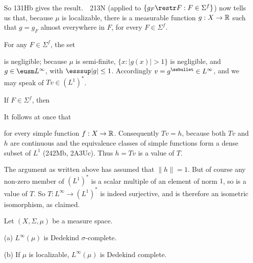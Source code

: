 {\noindent So 131Hb gives the result.\ \QeD\   213N (applied to
$\{g_F\restr F:F\in\Sigma^f\}$) now tells us
that, because $\mu$ is localizable, there is a measurable function
$g:X\to\Bbb R$ such that $g=g_F$ almost everywhere in $F$, for every
$F\in\Sigma^f$.
     
\medskip
     
 For any $F\in\Sigma^f$, the set
     
     
\noindent is negligible;  because $\mu$ is semi-finite,
$\{x:|g(x)|>1\}$ is negligible, and $g\in\eusm L^{\infty}$, with
$\esssup|g|\le 1$.   Accordingly $v=g^{\ssbullet}\in L^{\infty}$, and we
may speak of $Tv\in(L^1)^*$.
     
\medskip
     
 If $F\in\Sigma^f$, then

     
\noindent It follows at once that

     
\noindent for every simple function $f:X\to\Bbb R$.
Consequently $Tv=h$, because both $Tv$ and $h$ are
continuous and the equivalence classes of simple functions form a dense
subset of $L^1$ (242Mb, 2A3Uc).   Thus $h=Tv$ is a value of $T$.
     
\medskip
     
 The
argument as written above has assumed that $\|h\|=1$.   But of course
any non-zero member of $(L^1)^*$ is a scalar multiple of an element of
norm $1$, so is a value of $T$.   So $T:L^{\infty}\to(L^1)^*$ is indeed
surjective, and is therefore an isometric isomorphism, as claimed.
}%
     
 Let $(X,\Sigma,\mu)$ be a measure space.
     
(a) $L^{\infty}(\mu)$ is Dedekind $\sigma$-complete.
     
(b) If $\mu$ is localizable, $L^{\infty}(\mu)$ is Dedekind complete.
     
